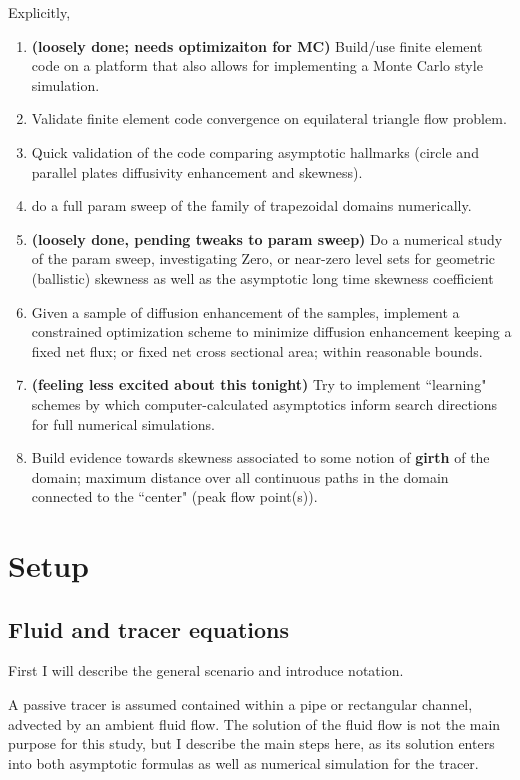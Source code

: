 \documentclass{amsart}
\begin{document}
Explicitly,
\begin{enumerate}
\item \textbf{(loosely done; needs optimizaiton for MC)}
Build/use finite element code on a platform that also allows for 
implementing a Monte Carlo style simulation.
\item Validate finite element code convergence on equilateral triangle flow problem.
\item Quick validation of the code comparing asymptotic hallmarks 
(circle and parallel plates diffusivity enhancement and skewness).
\item do a full param sweep of the family of trapezoidal domains numerically. 
\item \textbf{(loosely done, pending tweaks to param sweep)} 
Do a numerical study of the param sweep, investigating
Zero, or near-zero level sets for geometric (ballistic) skewness 
as well as the asymptotic long time skewness coefficient
\item Given a sample of diffusion enhancement of the samples, 
implement a constrained optimization scheme to minimize 
diffusion enhancement keeping a fixed net flux; or fixed net 
cross sectional area; within reasonable bounds.
\item \textbf{(feeling less excited about this tonight)} Try to implement ``learning" schemes by which computer-calculated 
asymptotics inform search directions for full numerical simulations.
\item Build evidence towards skewness associated to some notion of 
\textbf{girth} of the domain; maximum distance over all continuous 
paths in the domain connected to the ``center" (peak flow point(s)).
\end{enumerate}

\section{Setup}
\subsection{Fluid and tracer equations}
First I will describe the general scenario and introduce notation. 

A passive tracer is assumed contained within a pipe or rectangular channel, 
advected by an ambient fluid flow. The solution of the fluid flow is 
not the main purpose for this study, but I describe the main steps here, as its 
solution enters into both asymptotic formulas as well as numerical simulation 
for the tracer. 
\end{document}
